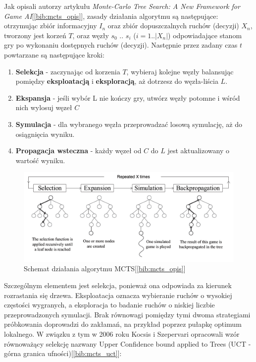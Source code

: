 Jak opisali autorzy artykułu \textit{Monte-Carlo Tree Search: A New Framework for Game AI}[\ref{bib:mcts_opis}], zasady działania algorytmu są następujące: otrzymując zbiór informacyjny $I_n$ oraz zbiór dopuszczalnych ruchów (decyzji) $X_n$, tworzony jest korzeń $T$, oraz węzły $s_0$ .. $s_i$ ($i=1..|X_n|$) odpowiadające stanom gry po wykonaniu dostępnych ruchów (decyzji). Następnie przez zadany czas $t$ powtarzane są następujące kroki:
\begin{enumerate}
	\item \textbf{Selekcja} - zaczynając od korzenia $T$, wybieraj kolejne węzły balansując pomiędzy \textbf{eksploatacją} i \textbf{eksploracją}, aż dotrzesz do węzła-liścia $L$.
	\item \textbf{Ekspansja} - jeśli wybór L nie kończy gry, utwórz węzły potomne i wśród nich wylosuj węzeł $C$
	\item \textbf{Symulacja} - dla wybranego węzła przeprowadzać losową symulację, aż do osiągnięcia wyniku.
	\item \textbf{Propagacja wsteczna} - każdy węzeł od $C$ do $L$ jest aktualizowany o wartość wyniku.
\end{enumerate}
\begin{figure}[h]
	\centering
	\includegraphics[width=\textwidth]{Resources/mcts.png}
	\caption{Schemat działania algorytmu MCTS[\ref{bib:mcts_opis}]} 
	\label{fig:llMainImage}
\end{figure}
Szczególnym elementem jest selekcja, ponieważ ona odpowiada za kierunek rozrastania się drzewa. Eksploatacja oznacza wybieranie ruchów o wysokiej częstości wygranych, a eksploracja to badanie ruchów o niskiej liczbie przeprowadzonych symulacji. Brak równowagi pomiędzy tymi dwoma strategiami próbkowania doprowadzi do zakłamań, na przykład poprzez pułapkę optimum lokalnego. W związku z tym w 2006 roku Kocsis i Szepervari opracowali wzór równoważący selekcję nazwany Upper Confidence bound applied to Trees (UCT - górna granica ufności)[\ref{bib:mcts_uct}]:
